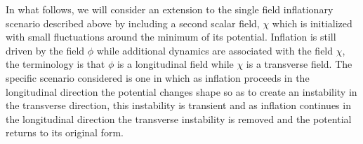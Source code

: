 \documentclass[letterpaper,11pt]{article}
\begin{document}

In what follows, we will consider an extension to the single field inflationary scenario described above by including a second scalar field, $\chi$ which is initialized with small fluctuations around the minimum of its potential. Inflation is still driven by the field $\phi$ while additional dynamics are associated with the field $\chi$, the terminology is that $\phi$ is a longitudinal field while $\chi$ is a transverse field. The specific scenario considered is one in which as inflation proceeds in the longitudinal direction the potential changes shape so as to create an instability in the transverse direction, this instability is transient and as inflation continues in the longitudinal direction the transverse instability is removed and the potential returns to its original form.

\end{document}

